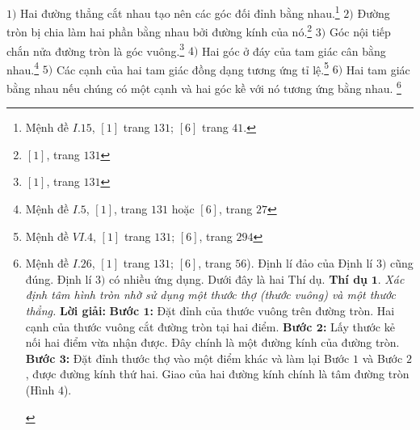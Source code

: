 \begin{multicols}{2}
	\vskip 0.1cm
	$1)$  Hai đường thẳng cắt nhau tạo nên các góc đối đỉnh bằng nhau.\footnote[2]{Mệnh đề $I.15$, $[1]$ trang $131$; $[6]$ trang $41$.}
	\vskip 0.1cm
	$2)$  Đường tròn bị chia làm hai phần bằng nhau bởi đường kính của nó.\footnote[3]{$[1]$, trang $131$}
	\vskip 0.1cm 
	$3)$ Góc nội tiếp chắn nửa đường tròn là góc vuông.\footnote[4]{$[1]$, trang $131$}
	\vskip 0.1cm 
	$4)$ Hai góc ở đáy của tam giác cân bằng nhau.\footnote[5]{Mệnh đề $I.5$, $[1]$, trang $131$ hoặc $[6]$, trang $27$}
	\vskip 0.1cm
	$5)$ Các cạnh của hai tam giác đồng dạng tương ứng tỉ lệ.\footnote[6]{Mệnh đề $VI.4$, $[1]$ trang $131$; $[6]$, trang $294$} 
	\vskip 0.1cm
	$6)$ Hai tam giác bằng nhau nếu chúng có một cạnh và hai góc kề với nó tương ứng bằng nhau. \footnote[7]{Mệnh đề $I.26$, $[1]$ trang $131$; $[6]$, trang $56$).
	\vskip 0.1cm 
	Định lí đảo của Định lí $3)$ cũng đúng. Định lí $3)$ có nhiều ứng dụng. Dưới đây là hai Thí dụ.
	\vskip 0.1cm
	\textbf{Thí dụ} $\pmb{1.}$ \textit{Xác định tâm hình  tròn nhờ sử dụng một thước thợ (thước vuông) và một thước thẳng.}
	\vskip 0.1cm
	\textbf{Lời giải:}
	\textbf{Bước $\pmb{1}$:} Đặt đỉnh của thước vuông trên đường tròn. Hai cạnh của thước vuông cắt đường tròn tại hai điểm. 
	\vskip 0.1cm
	\textbf{Bước $\pmb{2}$:} Lấy thước kẻ nối hai điểm vừa nhận được. Đây chính là một đường kính của đường tròn. 
	\vskip 0.1cm
	\textbf{Bước $\pmb{3}$:} Đặt đỉnh thước thợ vào một điểm khác và làm lại Bước $1$ và Bước $2$, được đường kính thứ hai. Giao của hai đường kính chính là tâm đường tròn (Hình $4$). 
	\begin{figure}[H]
		\centering
		\vspace*{-5pt}
		\captionsetup{labelformat= empty, justification=centering}

\end{figure}}
\end{multicols}
